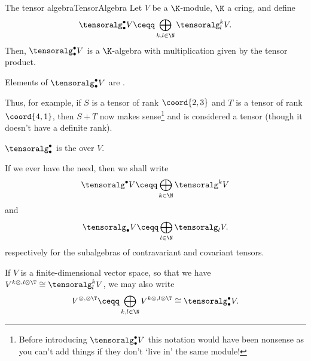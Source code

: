 \begin{thm}{The tensor algebra}{TensorAlgebra}
	Let $V$ be a $\K$-module, $\K$ a cring, and define
	\begin{equation}
		\tensoralg _{\bullet}^{\bullet}V\ceqq \bigoplus _{k,l\in \N}\tensoralg _l^kV.
	\end{equation}\index[notation]{$\tensoralg _{\bullet}^{\bullet}$} 
	Then, $\tensoralg _{\bullet}^{\bullet}V$ is a $\K$-algebra with multiplication given by the tensor product.
	\begin{rmk}
		Elements of $\tensoralg _{\bullet}^{\bullet}V$ are .
		
		Thus, for example, if $S$ is a tensor of rank $\coord{2,3}$ and $T$ is a tensor of rank $\coord{4,1}$, then $S+T$ now makes sense\footnote{Before introducing $\tensoralg _{\bullet}^{\bullet}V$ this notation would have been nonsense as you can't add things if they don't `live in' the same module!} and is considered a tensor (though it doesn't have a definite rank).
	\end{rmk}
	\begin{rmk}
		$\tensoralg _{\bullet}^{\bullet}$ is the  over $V$.
	\end{rmk}
	\begin{rmk}	
		If we ever have the need, then we shall write
		\begin{equation}
			\tensoralg ^{\bullet}V\ceqq \bigoplus _{k\in \N}\tensoralg ^kV
		\end{equation}\index[notation]{$\tensoralg ^{\bullet}V$}
		and
		\begin{equation}
			\tensoralg _{\bullet}V\ceqq \bigoplus _{l\in \N}\tensoralg _lV.
		\end{equation}\index[notation]{$\tensoralg _{\bullet}V$}
		respectively for the subalgebras of contravariant and covariant tensors.
	\end{rmk}
	\begin{rmk}
		If $V$ is a finite-dimensional vector space, so that we have $V^{k\otimes ,l\otimes \T}\cong \tensoralg _l^kV$, we may also write
		\begin{equation}
			V^{\otimes ,\otimes \T}\ceqq \bigoplus _{k,l\in \N}V^{k\otimes ,l\otimes \T}\cong \tensoralg _{\bullet}^{\bullet}V.
		\end{equation}\index[notation]{$V^{\otimes ,\otimes \T}$}
		

\end{rmk}
\end{thm}
